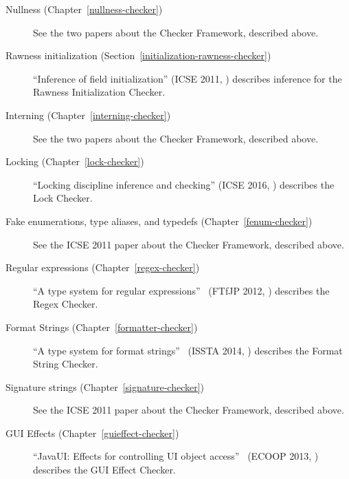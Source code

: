 \begin{description}
\item[Nullness (Chapter~\ref{nullness-checker})]
See the two papers about the Checker Framework, described above.

\item[Rawness initialization (Section~\ref{initialization-rawness-checker})]
``Inference of field initialization'' (ICSE 2011, )
describes inference for the Rawness Initialization Checker.

\item[Interning (Chapter~\ref{interning-checker})]
See the two papers about the Checker Framework, described above.

\item[Locking (Chapter~\ref{lock-checker})]
``Locking discipline inference and checking'' (ICSE 2016,
)
describes the Lock Checker.

\item[Fake enumerations, type aliases, and typedefs (Chapter~\ref{fenum-checker})]
See the ICSE 2011 paper about the Checker Framework, described above.

\item[Regular expressions (Chapter~\ref{regex-checker})]
``A type system for regular expressions''~\cite{SpishakDE2012} (FTfJP 2012, )
            describes the Regex Checker.

\item[Format Strings (Chapter~\ref{formatter-checker})]
``A type system for format strings''~\cite{WeitzKSE2014} (ISSTA 2014, )
            describes the Format String Checker.

\item[Signature strings (Chapter~\ref{signature-checker})]
See the ICSE 2011 paper about the Checker Framework, described above.

\item[GUI Effects (Chapter~\ref{guieffect-checker})]
``JavaUI: Effects for controlling UI object access''~\cite{GordonDEG2013} (ECOOP 2013, )
            describes the GUI Effect Checker.


\end{description}
